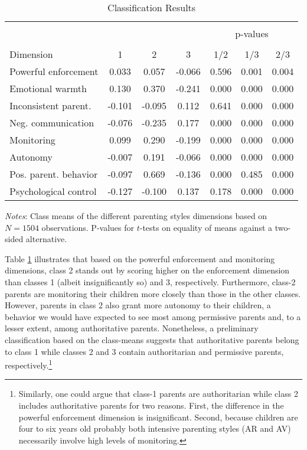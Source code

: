 \begin{table}[!htbp]
	\centering
	\begin{threeparttable}
		\caption{Classification Results}
		\label{tab:class}
		\begin{tabular}{lcccccc}
			\hline \hline\\[-1.8ex] 
			&    &    &    &\multicolumn{3}{c}{p-values} \\ 
			\cline{5-7} \\[-1.8ex]Dimension & 1 & 2 & 3 & 1/2 & 1/3 & 2/3 \\ 
			\midrule
			Powerful enforcement & 0.033 & 0.057 & -0.066 & 0.596 & 0.001 & 0.004 \\ 
			Emotional warmth & 0.130 & 0.370 & -0.241 & 0.000 & 0.000 & 0.000 \\ 
			Inconsistent parent. & -0.101 & -0.095 & 0.112 & 0.641 & 0.000 & 0.000 \\ 
			Neg. communication & -0.076 & -0.235 & 0.177 & 0.000 & 0.000 & 0.000 \\ 
			Monitoring & 0.099 & 0.290 & -0.199 & 0.000 & 0.000 & 0.000 \\ 
			Autonomy & -0.007 & 0.191 & -0.066 & 0.000 & 0.000 & 0.000 \\ 
			Pos. parent. behavior & -0.097 & 0.669 & -0.136 & 0.000 & 0.485 & 0.000 \\ 
			Psychological control & -0.127 & -0.100 & 0.137 & 0.178 & 0.000 & 0.000 \\ 
			\hline \bottomrule
		\end{tabular}
		\begin{tablenotes}
			\small
			\item \textit{Notes}: Class means of the different parenting styles dimensions based on $N = 1504$ observations. P-values for $t$-tests on equality of means against a two-sided alternative.
		\end{tablenotes}
	\end{threeparttable}
\end{table}
%

Table \ref{tab:class} illustrates that based on the powerful enforcement and monitoring dimensions, class 2 stands out by scoring higher on the enforcement dimension than classes 1 (albeit insignificantly so) and 3, respectively. Furthermore, class-2 parents are monitoring their children more closely than those in the other classes. However, parents in class 2 also grant more autonomy to their children, a behavior we would have expected to see most among permissive parents and, to a lesser extent, among authoritative parents. Nonetheless, a preliminary classification based on the class-means suggests that authoritative parents belong to class 1 while classes 2 and 3 contain authoritarian and permissive parents, respectively.\footnote{
 Similarly, one could argue that class-1 parents are authoritarian while class 2 includes authoritative parents for two reasons. First, the difference in the powerful enforcement dimension is insignificant. Second, because children are four to six years old probably both intensive parenting styles (AR and AV) necessarily involve high levels of monitoring.
} 

